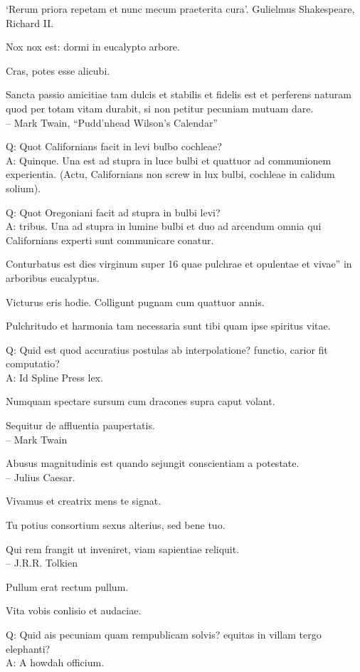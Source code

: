 \documentclass[titlepage,12pt]{memoir}
\begin{document}
‘Rerum priora repetam et nunc mecum praeterita cura’.
Gulielmus Shakespeare, Richard II.

Nox nox est: dormi in eucalypto arbore.

Cras, potes esse alicubi.

 Sancta passio amicitiae tam dulcis et stabilis et fidelis est et
perferens naturam quod per totam vitam durabit, si non petitur
pecuniam mutuam dare.
\\-- Mark Twain, “Pudd’nhead Wilson’s Calendar”

Q: Quot Californians facit in levi bulbo cochleae?\\
A: Quinque. Una est ad stupra in luce bulbi et quattuor ad communionem
experientia. (Actu, Californians non screw in
lux bulbi, cochleae in calidum solium).

Q: Quot Oregoniani facit ad stupra in bulbi levi?\\
A: tribus. Una ad stupra in lumine bulbi et duo ad arcendum omnia
qui Californians experti sunt communicare conatur.

Conturbatus est dies virginum super 16 quae pulchrae et opulentae et vivae”
in arboribus eucalyptus.

Victurus eris hodie. Colligunt pugnam cum quattuor annis.

 Pulchritudo et harmonia tam necessaria sunt tibi quam ipse spiritus vitae.

Q: Quid est quod accuratius postulas ab interpolatione?
functio, carior fit computatio?\\
A: Id Spline Press lex.

Numquam spectare sursum cum dracones supra caput volant.

Sequitur de affluentia paupertatis.
\\-- Mark Twain

Abusus magnitudinis est quando sejungit conscientiam a potestate.
\\-- Julius Caesar.

Vivamus et creatrix mens te signat.

Tu potius consortium sexus alterius, sed bene tuo.

Qui rem frangit ut inveniret, viam sapientiae reliquit.
\\-- J.R.R. Tolkien

Pullum erat rectum pullum.

Vita vobis conlisio et audaciae.

Q: Quid ais pecuniam quam rempublicam solvis?
equitas in villam tergo elephanti?\\
A: A howdah officium.
\end{document}
